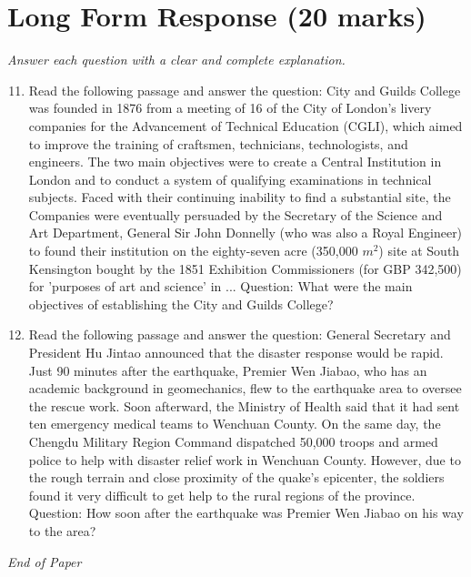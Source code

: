 \documentclass[12pt]{article}
\begin{document}
\section*{Long Form Response (20 marks)}
\textit{Answer each question with a clear and complete explanation.}
\begin{enumerate}[label=\arabic*.]
\setcounter{enumi}{10}
\item Read the following passage and answer the question: City and Guilds College was founded in 1876 from a meeting of 16 of the City of London's livery companies for the Advancement of Technical Education (CGLI), which aimed to improve the training of craftsmen, technicians, technologists, and engineers. The two main objectives were to create a Central Institution in London and to conduct a system of qualifying examinations in technical subjects. Faced with their continuing inability to find a substantial site, the Companies were eventually persuaded by the Secretary of the Science and Art Department, General Sir John Donnelly (who was also a Royal Engineer) to found their institution on the eighty-seven acre (350,000 $m^2$) site at South Kensington bought by the 1851 Exhibition Commissioners (for GBP 342,500) for 'purposes of art and science' in ... Question: What were the main objectives of establishing the City and Guilds College?
\item Read the following passage and answer the question: General Secretary and President Hu Jintao announced that the disaster response would be rapid. Just 90 minutes after the earthquake, Premier Wen Jiabao, who has an academic background in geomechanics, flew to the earthquake area to oversee the rescue work. Soon afterward, the Ministry of Health said that it had sent ten emergency medical teams to Wenchuan County. On the same day, the Chengdu Military Region Command dispatched 50,000 troops and armed police to help with disaster relief work in Wenchuan County. However, due to the rough terrain and close proximity of the quake's epicenter, the soldiers found it very difficult to get help to the rural regions of the province. Question: How soon after the earthquake was Premier Wen Jiabao on his way to the area?
\end{enumerate}

\vfill
\noindent\textit{End of Paper}
\end{document}
